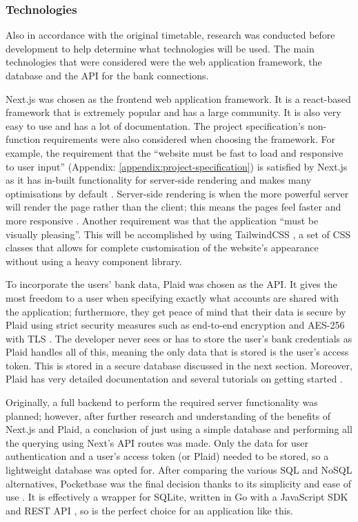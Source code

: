 \subsubsection{Technologies}
Also in accordance with the original timetable, research was conducted before development to help determine what technologies will be used. The main technologies that were considered were the web application framework, the database and the API for the bank connections.

Next.js was chosen as the frontend web application framework. It is a react-based framework that is extremely popular and has a large community. It is also very easy to use and has a lot of documentation. The project specification's non-function requirements were also considered when choosing the framework. For example, the requirement that the ``website must be fast to load and responsive to user input'' (Appendix: \ref{appendix:project-specification}) is satisfied by Next.js as it has in-built functionality for server-side rendering and makes many optimisations by default \cite{NextjsPerformance}. Server-side rendering is when the more powerful server will render the page rather than the client; this means the pages feel faster and more responsive \cite{SSR}. Another requirement was that the application ``must be visually pleasing''. This will be accomplished by using TailwindCSS \cite{TailwindCSS}, a set of CSS classes that allows for complete customisation of the website's appearance without using a heavy component library.

To incorporate the users' bank data, Plaid was chosen as the API. It gives the most freedom to a user when specifying exactly what accounts are shared with the application; furthermore, they get peace of mind that their data is secure by Plaid using strict security measures such as end-to-end encryption and AES-256 with TLS \cite{Plaid}. The developer never sees or has to store the user's bank credentials as Plaid handles all of this, meaning the only data that is stored is the user's access token. This is stored in a secure database discussed in the next section. Moreover, Plaid has very detailed documentation and several tutorials on getting started \cite{PlaidGettingStarted}.

Originally, a full backend to perform the required server functionality was planned; however, after further research and understanding of the benefits of Next.js and Plaid, a conclusion of just using a simple database and performing all the querying using Next's API routes was made. Only the data for user authentication and a user's access token (or Plaid) needed to be stored, so a lightweight database was opted for. After comparing the various SQL and NoSQL alternatives, Pocketbase was the final decision thanks to its simplicity and ease of use \cite{NoBackendsPocketbase}. It is effectively a wrapper for SQLite, written in Go with a JavaScript SDK and REST API \cite{PocketbaseJavaScriptSDK}, so is the perfect choice for an application like this.

